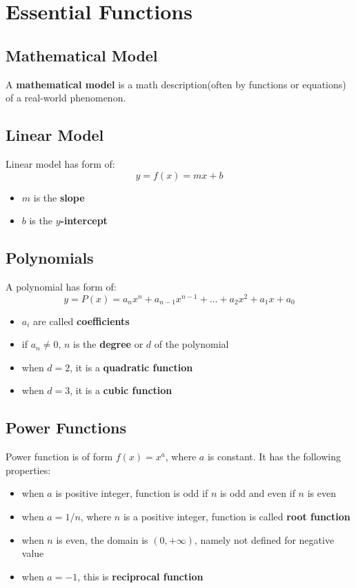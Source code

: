 \documentclass[10pt,a4paper,oneside]{article}
\begin{document}
\section{Essential Functions}
\subsection{Mathematical Model}
A \textbf{mathematical model} is a math description(often by functions or equations) of a real-world phenomenon.

\subsection{Linear Model}
Linear model has form of:
\[
y = f(x) = mx+b
\]
\begin{itemize}
	\item $m$ is the \textbf{slope}
	\item $b$ is the \textbf{$y$-intercept}
\end{itemize}

\subsection{Polynomials}
A polynomial has form of:
\[
y = P(x) = a_n x^n + a_{n-1} x^{n-1} + \dots + a_2 x^2 + a_1 x + a_0
\]
\begin{itemize}
	\item $a_i$ are called \textbf{coefficients}
	\item if $a_n \neq 0$, $n$ is the \textbf{degree} or $d$ of the polynomial
	\item when $d = 2$, it is a \textbf{quadratic function}
	\item when $d = 3$, it is a \textbf{cubic function}
\end{itemize}

\subsection{Power Functions}
Power function is of form $f(x) = x^a$, where $a$ is constant. It has the following properties:
\begin{itemize}
	\item when $a$ is positive integer, function is odd if $n$ is odd and even if $n$ is even
	\item when $a = 1/n$, where $n$ is a positive integer, function is called \textbf{root function}
	\item when $n$ is even, the domain is $(0, +\infty)$, namely not defined for negative value
	\item when $a = -1$, this is \textbf{reciprocal function}
\end{itemize}
\end{document}
